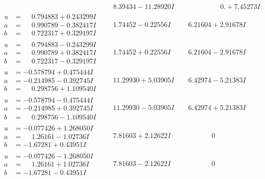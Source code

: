\documentclass[1p]{elsarticle_modified}
\theoremstyle{definition}
\begin{document}
$$\begin{array}{c|c|c}
 & \phantom{-}8.39434 - 11.28920 I & \phantom{-0.000000 -}0. + 7.45273 I \\ \hline\begin{aligned}
u &= \phantom{-}0.794883 + 0.243299 I \\
a &= \phantom{-}0.990789 - 0.382417 I \\
b &= \phantom{-}0.722317 + 0.329197 I\end{aligned}
 & \phantom{-}1.74452 - 0.22556 I & \phantom{-}6.21604 + 2.91678 I \\ \hline\begin{aligned}
u &= \phantom{-}0.794883 - 0.243299 I \\
a &= \phantom{-}0.990789 + 0.382417 I \\
b &= \phantom{-}0.722317 - 0.329197 I\end{aligned}
 & \phantom{-}1.74452 + 0.22556 I & \phantom{-}6.21604 - 2.91678 I \\ \hline\begin{aligned}
u &= -0.578794 + 0.475444 I \\
a &= -0.214985 - 0.392745 I \\
b &= \phantom{-}0.298756 + 1.109540 I\end{aligned}
 & \phantom{-}11.29930 + 5.03905 I & \phantom{-}6.42974 - 5.21383 I \\ \hline\begin{aligned}
u &= -0.578794 - 0.475444 I \\
a &= -0.214985 + 0.392745 I \\
b &= \phantom{-}0.298756 - 1.109540 I\end{aligned}
 & \phantom{-}11.29930 - 5.03905 I & \phantom{-}6.42974 + 5.21383 I \\ \hline\begin{aligned}
u &= -0.077426 + 1.268050 I \\
a &= \phantom{-}1.26161 - 1.02736 I \\
b &= -1.67281 + 0.43951 I\end{aligned}
 & \phantom{-}7.81603 + 2.12622 I & \phantom{-0.000000 } 0 \\ \hline\begin{aligned}
u &= -0.077426 - 1.268050 I \\
a &= \phantom{-}1.26161 + 1.02736 I \\
b &= -1.67281 - 0.43951 I\end{aligned}
 & \phantom{-}7.81603 - 2.12622 I & \phantom{-0.000000 } 0 \\ \hline\begin{aligned}

\end{aligned}
\end{array}$$
\end{document}
